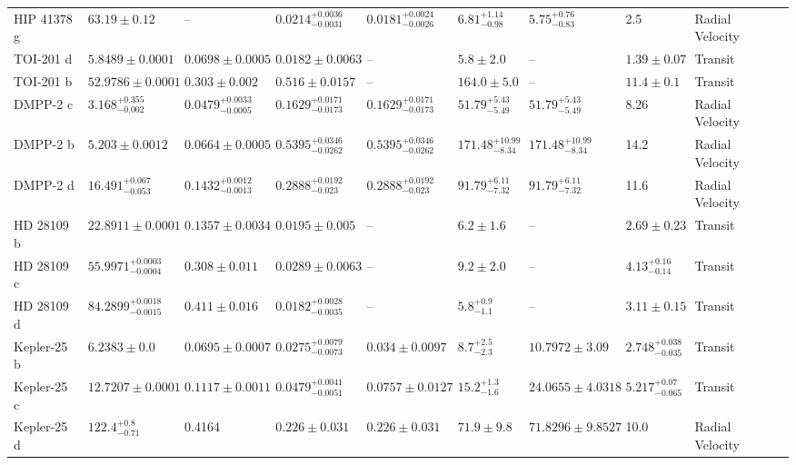 \begin{tabular}{llllllllll}
HIP 41378 g & $63.19 \pm 0.12$ & -- & $0.0214^{+0.0036}_{-0.0031}$ & $0.0181^{+0.0024}_{-0.0026}$ & $6.81^{+1.14}_{-0.98}$ & $5.75^{+0.76}_{-0.83}$ & 2.5 & Radial Velocity & \cite{GROUFFAL_ET_AL_2026} \\
TOI-201 d & $5.8489 \pm 0.0001$ & $0.0698 \pm 0.0005$ & $0.0182 \pm 0.0063$ & -- & $5.8 \pm 2.0$ & -- & $1.39 \pm 0.07$ & Transit & \cite{MIRELES_ET_AL_2026} \\
TOI-201 b & $52.9786 \pm 0.0001$ & $0.303 \pm 0.002$ & $0.516 \pm 0.0157$ & -- & $164.0 \pm 5.0$ & -- & $11.4 \pm 0.1$ & Transit & \cite{MIRELES_ET_AL_2026} \\
DMPP-2 c & $3.168^{+0.355}_{-0.002}$ & $0.0479^{+0.0033}_{-0.0005}$ & $0.1629^{+0.0171}_{-0.0173}$ & $0.1629^{+0.0171}_{-0.0173}$ & $51.79^{+5.43}_{-5.49}$ & $51.79^{+5.43}_{-5.49}$ & 8.26 & Radial Velocity & \cite{STANDING_ET_AL_2026} \\
DMPP-2 b & $5.203 \pm 0.0012$ & $0.0664 \pm 0.0005$ & $0.5395^{+0.0346}_{-0.0262}$ & $0.5395^{+0.0346}_{-0.0262}$ & $171.48^{+10.99}_{-8.34}$ & $171.48^{+10.99}_{-8.34}$ & 14.2 & Radial Velocity & \cite{STANDING_ET_AL_2026} \\
DMPP-2 d & $16.491^{+0.067}_{-0.053}$ & $0.1432^{+0.0012}_{-0.0013}$ & $0.2888^{+0.0192}_{-0.023}$ & $0.2888^{+0.0192}_{-0.023}$ & $91.79^{+6.11}_{-7.32}$ & $91.79^{+6.11}_{-7.32}$ & 11.6 & Radial Velocity & \cite{STANDING_ET_AL_2026} \\
HD 28109 b & $22.8911 \pm 0.0001$ & $0.1357 \pm 0.0034$ & $0.0195 \pm 0.005$ & -- & $6.2 \pm 1.6$ & -- & $2.69 \pm 0.23$ & Transit & \cite{BARONE_ET_AL_2025} \\
HD 28109 c & $55.9971^{+0.0003}_{-0.0004}$ & $0.308 \pm 0.011$ & $0.0289 \pm 0.0063$ & -- & $9.2 \pm 2.0$ & -- & $4.13^{+0.16}_{-0.14}$ & Transit & \cite{BARONE_ET_AL_2025} \\
HD 28109 d & $84.2899^{+0.0018}_{-0.0015}$ & $0.411 \pm 0.016$ & $0.0182^{+0.0028}_{-0.0035}$ & -- & $5.8^{+0.9}_{-1.1}$ & -- & $3.11 \pm 0.15$ & Transit & \cite{BARONE_ET_AL_2025} \\
Kepler-25 b & $6.2383 \pm 0.0$ & $0.0695 \pm 0.0007$ & $0.0275^{+0.0079}_{-0.0073}$ & $0.034 \pm 0.0097$ & $8.7^{+2.5}_{-2.3}$ & $10.7972 \pm 3.09$ & $2.748^{+0.038}_{-0.035}$ & Transit & \cite{MILLS_ET_AL__2019} \\
Kepler-25 c & $12.7207 \pm 0.0001$ & $0.1117 \pm 0.0011$ & $0.0479^{+0.0041}_{-0.0051}$ & $0.0757 \pm 0.0127$ & $15.2^{+1.3}_{-1.6}$ & $24.0655 \pm 4.0318$ & $5.217^{+0.07}_{-0.065}$ & Transit & \cite{MILLS_ET_AL__2019} \\
Kepler-25 d & $122.4^{+0.8}_{-0.71}$ & 0.4164 & $0.226 \pm 0.031$ & $0.226 \pm 0.031$ & $71.9 \pm 9.8$ & $71.8296 \pm 9.8527$ & 10.0 & Radial Velocity & \cite{MILLS_ET_AL__2019} \\
\bottomrule
\end{tabular}
